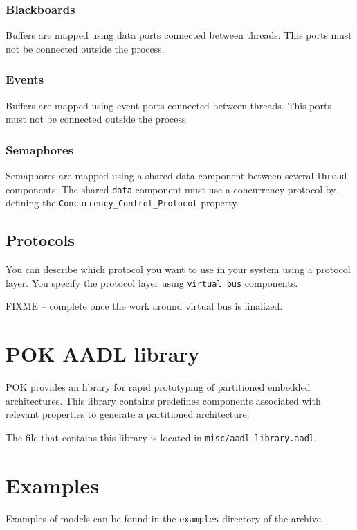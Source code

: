          \subsubsection{Blackboards}
         Buffers are mapped using \aadl data ports connected between \aadl
         threads. This ports must not be connected outside the process.

         \subsubsection{Events}
         Buffers are mapped using \aadl event ports connected between \aadl
         threads. This ports must not be connected outside the process.

         \subsubsection{Semaphores}
         Semaphores are mapped using a shared \aadl data component between
         several \aadl \texttt{thread} components. The shared \texttt{data}
         component must use a concurrency protocol by defining the
         \texttt{Concurrency\_Control\_Protocol} property.

      \subsection{Protocols}
      You can describe which protocol you want to use in your system using a
      protocol layer. You specify the protocol layer using \texttt{virtual bus}
      components.

      FIXME -- complete once the work around virtual bus is finalized.

   \section{POK AADL library}
   POK provides an \aadl library for rapid prototyping of partitioned
   embedded architectures. This library contains predefines components
   associated with relevant properties to generate a partitioned architecture.

   The file that contains this \aadl library is located in
   \texttt{misc/aadl-library.aadl}.

   \section{Examples}
   Examples of \aadl models can be found in the \texttt{examples} directory of
   the \pok archive.

